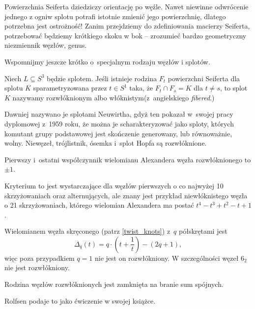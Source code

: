 Powierzchnia Seiferta dziedziczy orientację po węźle.
Nawet niewinne odwrócenie jednego z ogniw splotu potrafi istotnie zmienić jego powierzchnię, dlatego potrzebna jest ostrożność!
Zanim przejdziemy do zdefiniowania macierzy Seiferta, potrzebować będziemy krótkiego skoku w bok -- zrozumieć bardzo geometryczny niezmiennik węzłów, genus.

Wspomnijmy jeszcze krótko o~specjalnym rodzaju węzłów i splotów.

\begin{definition}
    Niech $L \subseteq S^3$ będzie splotem.
    Jeśli istnieje rodzina $F_t$ powierzchni Seiferta dla splotu $K$ sparametryzowana przez $t \in S^1$ taka, że $F_t \cap F_s = K$ dla $t \neq s$, to splot $K$ nazywamy rozwłóknionym albo włóknistym(z~angielskiego \emph{fibered}.)
\end{definition}

Dawniej nazywano je splotami Neuwirtha, gdyż ten pokazał w~swojej pracy dyplomowej z~1959 roku, że można je scharakteryzować jako sploty, których komutant grupy podstawowej jest skończenie generowany, lub równoważnie, wolny.
Niewęzeł, trójlistnik, ósemka i~splot Hopfa są rozwłóknione.

\begin{proposition}
    Pierwszy i~ostatni współczynnik wielomianu Alexandera węzła rozwłóknionego to $\pm 1$.
\end{proposition}

Kryterium to jest wystarczające dla węzłów pierwszych o co najwyżej 10 skrzyżowaniach oraz alternujących, ale znany jest przykład niewłóknistego węzła o 21 skrzyżowaniach, którego wielomian Alexandera ma postać $t^4 - t^3 + t^2 - t +1$.

Wielomianem węzła skręconego (patrz \ref{twist_knots}) z~$q$ półskrętami jest
\begin{equation}
    \Delta_q(t) = q \cdot \left(t + \frac 1 t\right)  - (2q+1),
\end{equation}
więc poza przypadkiem $q = 1$ nie jest on rozwłókniony.
W szczególności węzeł $6_2$ nie jest rozwłókniony.

\begin{proposition}
    Rodzina węzłów rozwłóknionych jest zamknięta na branie sum spójnych.
\end{proposition}

Rolfsen podaje to jako ćwiczenie w swojej książce.

